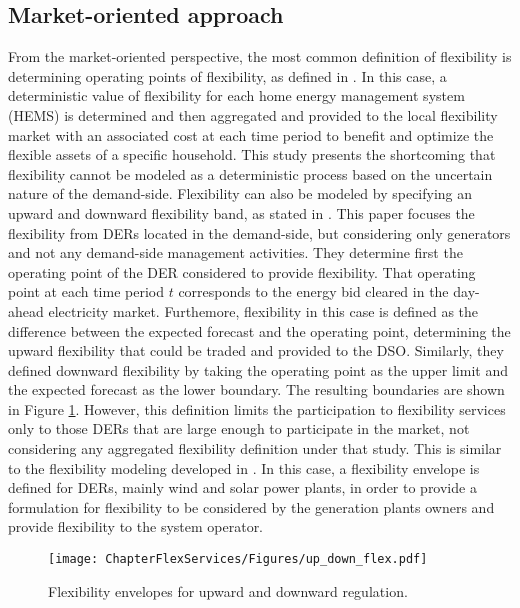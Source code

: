 \subsection{Market-oriented approach}
From the market-oriented perspective, the most common definition of flexibility is determining operating points of flexibility, as defined in \cite{Olivella-Rosell2018}. In this case, a deterministic value of flexibility for each home energy management system (HEMS) is determined and then aggregated and provided to the local flexibility market with an associated cost at each time period to benefit and optimize the flexible assets of a specific household. This study presents the shortcoming that flexibility cannot be modeled as a deterministic process based on the uncertain nature of the demand-side. Flexibility can also be modeled by specifying an upward and downward flexibility band, as stated in \cite{Soares2017}. This paper focuses the flexibility from DERs located in the demand-side, but considering only generators and not any demand-side management activities. They determine first the operating point of the DER considered to provide flexibility. That operating point at each time period $t$ corresponds to the energy bid cleared in the day-ahead electricity market. Furthemore, flexibility in this case is defined as the difference between the expected forecast and the operating point, determining the upward flexibility that could be traded and provided to the DSO. Similarly, they defined downward flexibility by taking the operating point as the upper limit and the expected forecast as the lower boundary. The resulting boundaries are shown in Figure \ref{fig:envelopes}. However, this definition limits the participation to flexibility services only to those DERs that are large enough to participate in the market, not considering any aggregated flexibility definition under that study. This is similar to the flexibility modeling developed in \cite{Nosair2015}. In this case, a flexibility envelope is defined for DERs, mainly wind and solar power plants, in order to provide a formulation for flexibility to be considered by the generation plants owners and provide flexibility to the system operator. 

\begin{figure}[htbp]
	\centering
	\texttt{[image: ChapterFlexServices/Figures/up\_down\_flex.pdf]}
		\caption{Flexibility envelopes for upward and downward regulation.}
	\label{fig:envelopes}  
\end{figure}

